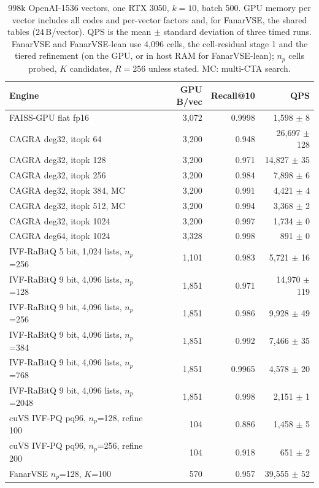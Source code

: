 \documentclass[fleqn,10pt]{wlscirep}
\begin{document}
\begin{table}[!htbp]
\caption{998k OpenAI-1536 vectors, one RTX 3050, $k=10$, batch 500. GPU memory per vector includes all codes and per-vector factors and, for FanarVSE, the shared tables (24\,B/vector). QPS is the mean $\pm$ standard deviation of three timed runs. FanarVSE and FanarVSE-lean use 4{,}096 cells, the cell-residual stage 1 and the tiered refinement (on the GPU, or in host RAM for FanarVSE-lean); $n_p$ cells probed, $K$ candidates, $R=256$ unless stated. MC: multi-CTA search.}
\label{tab:1m}
\small
\setlength{\tabcolsep}{4pt}
\begin{tabular}{lrrr}
\toprule
Engine & GPU B/vec & Recall@10 & QPS \\
\midrule
FAISS-GPU flat fp16 & 3{,}072 & 0.9998 & 1{,}598 $\pm$ 8 \\
CAGRA deg32, itopk 64 & 3{,}200 & 0.948 & 26{,}697 $\pm$ 128 \\
CAGRA deg32, itopk 128 & 3{,}200 & 0.971 & 14{,}827 $\pm$ 35 \\
CAGRA deg32, itopk 256 & 3{,}200 & 0.984 & 7{,}898 $\pm$ 6 \\
CAGRA deg32, itopk 384, MC & 3{,}200 & 0.991 & 4{,}421 $\pm$ 4 \\
CAGRA deg32, itopk 512, MC & 3{,}200 & 0.994 & 3{,}368 $\pm$ 2 \\
CAGRA deg32, itopk 1024 & 3{,}200 & 0.997 & 1{,}734 $\pm$ 0 \\
CAGRA deg64, itopk 1024 & 3{,}328 & 0.998 & 891 $\pm$ 0 \\
IVF-RaBitQ 5 bit, 1{,}024 lists, $n_p$=256 & 1{,}101 & 0.983 & 5{,}721 $\pm$ 16 \\
IVF-RaBitQ 9 bit, 4{,}096 lists, $n_p$=128 & 1{,}851 & 0.971 & 14{,}970 $\pm$ 119 \\
IVF-RaBitQ 9 bit, 4{,}096 lists, $n_p$=256 & 1{,}851 & 0.986 & 9{,}928 $\pm$ 49 \\
IVF-RaBitQ 9 bit, 4{,}096 lists, $n_p$=384 & 1{,}851 & 0.992 & 7{,}466 $\pm$ 35 \\
IVF-RaBitQ 9 bit, 4{,}096 lists, $n_p$=768 & 1{,}851 & 0.9965 & 4{,}578 $\pm$ 20 \\
IVF-RaBitQ 9 bit, 4{,}096 lists, $n_p$=2048 & 1{,}851 & 0.998 & 2{,}151 $\pm$ 1 \\
cuVS IVF-PQ pq96, $n_p$=128, refine 100 & 104 & 0.886 & 1{,}458 $\pm$ 5 \\
cuVS IVF-PQ pq96, $n_p$=256, refine 200 & 104 & 0.918 & 651 $\pm$ 2 \\
\midrule
FanarVSE $n_p$=128, $K$=100 & 570 & 0.957 & 39{,}555 $\pm$ 52 \\

\end{tabular}
\end{table}
\end{document}
